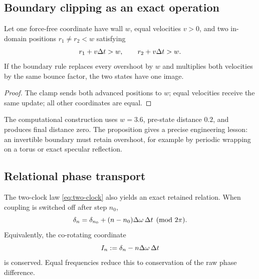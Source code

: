 \subsection{Boundary clipping as an exact operation}

\begin{proposition}
\label{prop:wall}
Let one force-free coordinate have wall \(w\), equal velocities \(v>0\), and two in-domain positions \(r_1\neq r_2<w\) satisfying
\[
r_1+v\Delta t>w,
\qquad
r_2+v\Delta t>w.
\]
If the boundary rule replaces every overshoot by \(w\) and multiplies both velocities by the same bounce factor, the two states have one image.
\end{proposition}

\begin{proof}
The clamp sends both advanced positions to \(w\); equal velocities receive the same update; all other coordinates are equal.
\end{proof}

The computational construction uses \(w=3.6\), pre-state distance \(0.2\), and produces final distance zero. The proposition gives a precise engineering lesson: an invertible boundary must retain overshoot, for example by periodic wrapping on a torus or exact specular reflection.

\subsection{Relational phase transport}

The two-clock law \cref{eq:two-clock} also yields an exact retained relation. When coupling is switched off after step \(n_0\),
\begin{equation}
\delta_n
=
\delta_{n_0}
+(n-n_0)\Delta\omega\,\Delta t
\pmod{2\pi}.
\label{eq:decoupled-phase}
\end{equation}
Equivalently, the co-rotating coordinate
\[
I_n:=\delta_n-n\Delta\omega\,\Delta t
\]
is conserved. Equal frequencies reduce this to conservation of the raw phase difference.


